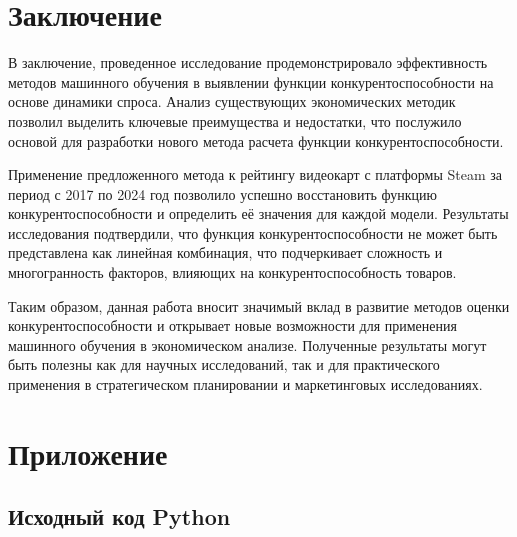 \documentclass[14pt, a4paper]{extarticle}
\begin{document}
\section{Заключение}

В заключение, проведенное исследование продемонстрировало эффективность методов машинного обучения в выявлении функции конкурентоспособности на основе динамики спроса. Анализ существующих экономических методик позволил выделить ключевые преимущества и недостатки, что послужило основой для разработки нового метода расчета функции конкурентоспособности.

Применение предложенного метода к рейтингу видеокарт с платформы Steam за период с 2017 по 2024 год позволило успешно восстановить функцию конкурентоспособности и определить её значения для каждой модели. Результаты исследования подтвердили, что функция конкурентоспособности не может быть представлена как линейная комбинация, что подчеркивает сложность и многогранность факторов, влияющих на конкурентоспособность товаров.

Таким образом, данная работа вносит значимый вклад в развитие методов оценки конкурентоспособности и открывает новые возможности для применения машинного обучения в экономическом анализе. Полученные результаты могут быть полезны как для научных исследований, так и для практического применения в стратегическом планировании и маркетинговых исследованиях.
\newpage

\section{Приложение}
\subsection{Исходный код Python}
\end{document}

